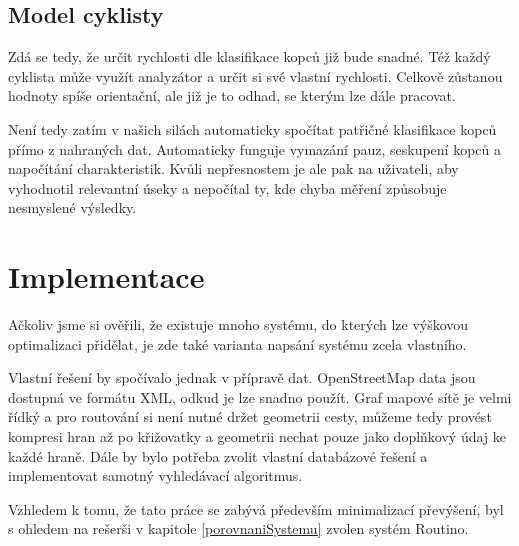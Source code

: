 \documentclass[thesis=B,czech]{FITthesis}[2012/06/26]
\begin{document}
\section{Model cyklisty}
Zdá se tedy, že určit rychlosti dle klasifikace kopců již bude snadné. Též každý cyklista může využít analyzátor a určit si své vlastní rychlosti. Celkově zůstanou hodnoty spíše orientační, ale již je to odhad, se kterým lze dále pracovat.

Není tedy zatím v našich silách automaticky spočítat patřičné klasifikace kopců přímo z nahraných dat. Automaticky funguje vymazání pauz, seskupení kopců a napočítání charakteristik. Kvůli nepřesnostem je ale pak na uživateli, aby vyhodnotil relevantní úseky a nepočítal ty, kde chyba měření způsobuje nesmyslené výsledky.
























\chapter{Implementace}
Ačkoliv jsme si ověřili, že existuje mnoho systému, do kterých lze výškovou optimalizaci přidělat, je zde také varianta napsání systému zcela vlastního.

Vlastní řešení by spočívalo jednak v přípravě dat. OpenStreetMap data jsou dostupná ve formátu XML, odkud je lze snadno použít. Graf mapové sítě je velmi řídký a pro routování si není nutné držet geometrii cesty, můžeme tedy provést kompresi hran až po křižovatky a geometrii nechat pouze jako doplňkový údaj ke každé hraně. Dále by bylo potřeba zvolit vlastní databázové řešení a implementovat samotný vyhledávací algoritmus.

Vzhledem k tomu, že tato práce se zabývá především minimalizací převýšení, byl s ohledem na rešerši v kapitole \ref{porovnaniSystemu} zvolen systém Routino.
\end{document}
